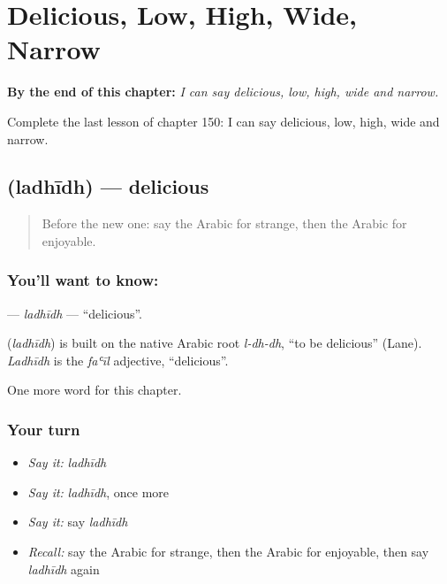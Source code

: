 
\chapter{Delicious, Low, High, Wide, Narrow}
\label{ch:ar-delicious-low-high-wide-narrow}

\begin{chapteropening}
\textbf{By the end of this chapter:} \emph{I can say delicious, low, high, wide and narrow.}

Complete the last lesson of chapter 150: I can say delicious, low, high, wide and narrow.
\end{chapteropening}

\section[\texorpdfstring{\ar{لذيذ} (ladhīdh)}{لذيذ (ladhīdh)}]{ (ladhīdh) — delicious}

\label{lesson:AR-C150-ladhidh}



\begin{quote}
Before the new one: say the Arabic for strange, then the Arabic for enjoyable.
\end{quote}

\subsection*{You'll want to know: }
\textbf{} — \emph{ladhīdh} — \textquotedblleft{}delicious\textquotedblright{}.

\begin{cousinweb}
\textbf{} (\emph{ladhīdh}) is built on the native Arabic root \emph{l-dh-dh}, \textquotedblleft{}to be delicious\textquotedblright{} (Lane). \emph{Ladhīdh} is the \emph{faʿīl} adjective, \textquotedblleft{}delicious\textquotedblright{}.
\end{cousinweb}

\begin{grammarlens}[title={What you've built}]
One more word for this chapter.
\end{grammarlens}

\subsection*{Your turn}
\begin{itemize}
\raggedright
  \item \emph{Say it:} \emph{ladhīdh}
  \item \emph{Say it:} \emph{ladhīdh}, once more
  \item \emph{Say it:} say \emph{ladhīdh}
  \item \emph{Recall:} say the Arabic for strange, then the Arabic for enjoyable, then say \emph{ladhīdh} again
\end{itemize}

